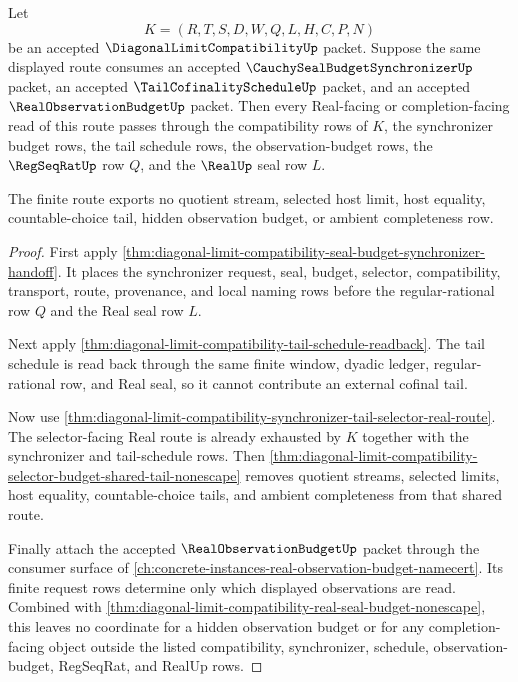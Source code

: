 \begin{theorem}
\label{thm:diagonal-limit-compatibility-tail-budget-observation-triple-lock}
Let
$$
K=(R,T,S,D,W,Q,L,H,C,P,N)
$$
be an accepted $\DiagonalLimitCompatibilityUp$ packet. Suppose the same displayed route consumes an accepted $\CauchySealBudgetSynchronizerUp$ packet, an accepted $\TailCofinalityScheduleUp$ packet, and an accepted $\RealObservationBudgetUp$ packet. Then every Real-facing or completion-facing read of this route passes through the compatibility rows of $K$, the synchronizer budget rows, the tail schedule rows, the observation-budget rows, the $\RegSeqRatUp$ row $Q$, and the $\RealUp$ seal row $L$.

The finite route exports no quotient stream, selected host limit, host equality, countable-choice tail, hidden observation budget, or ambient completeness row.
\end{theorem}
\begin{proof}
First apply \autoref{thm:diagonal-limit-compatibility-seal-budget-synchronizer-handoff}. It places the synchronizer request, seal, budget, selector, compatibility, transport, route, provenance, and local naming rows before the regular-rational row $Q$ and the Real seal row $L$.

Next apply \autoref{thm:diagonal-limit-compatibility-tail-schedule-readback}. The tail schedule is read back through the same finite window, dyadic ledger, regular-rational row, and Real seal, so it cannot contribute an external cofinal tail.

Now use \autoref{thm:diagonal-limit-compatibility-synchronizer-tail-selector-real-route}. The selector-facing Real route is already exhausted by $K$ together with the synchronizer and tail-schedule rows. Then \autoref{thm:diagonal-limit-compatibility-selector-budget-shared-tail-nonescape} removes quotient streams, selected limits, host equality, countable-choice tails, and ambient completeness from that shared route.

Finally attach the accepted $\RealObservationBudgetUp$ packet through the consumer surface of \autoref{ch:concrete-instances-real-observation-budget-namecert}. Its finite request rows determine only which displayed observations are read. Combined with \autoref{thm:diagonal-limit-compatibility-real-seal-budget-nonescape}, this leaves no coordinate for a hidden observation budget or for any completion-facing object outside the listed compatibility, synchronizer, schedule, observation-budget, RegSeqRat, and RealUp rows.
\end{proof}

